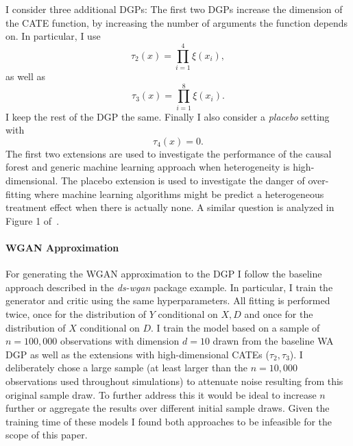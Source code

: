 \documentclass[11pt, a4paper, leqno]{article}
\begin{document}
I consider three additional DGPs: The first two DGPs increase the dimension of the CATE function, by increasing the number of arguments the function depends on.
In particular, I use
\begin{equation*}
    \tau_2(x) = \prod_{i=1}^{4}\xi(x_i),
\end{equation*}
as well as
\begin{equation*}
    \tau_3(x) = \prod_{i=1}^{8}\xi(x_i).
\end{equation*}
I keep the rest of the DGP the same. Finally I also consider a \textit{placebo} setting with
\begin{equation*}
    \tau_4(x) = 0.
\end{equation*}
The first two extensions are used to investigate the performance of the causal forest and generic machine learning approach when heterogeneity is high-dimensional.
The placebo extension is used to investigate the danger of over-fitting where machine learning algorithms might be predict a heterogeneous treatment effect when there is actually none.
A similar question is analyzed in Figure 1 of~\citet{chernozhukov2023genml}.

\paragraph*{WGAN Approximation}
For generating the WGAN approximation to the DGP I follow the baseline approach described in the \textit{ds-wgan} package example.
In particular, I train the generator and critic using the same hyperparameters.
All fitting is performed twice, once for the distribution of $Y$ conditional on $X, D$ and once for the distribution of $X$ conditional on $D$.
I train the model based on a sample of $n=100,000$ observations with dimension $d=10$ drawn from the baseline WA DGP as well as the extensions with high-dimensional CATEs ($\tau_2, \tau_3$).
I deliberately chose a large sample (at least larger than the $n=10,000$ observations used throughout simulations) to attenuate noise resulting from this original sample draw.
To further address this it would be ideal to increase $n$ further or aggregate the results over different initial sample draws.
Given the training time of these models I found both approaches to be infeasible for the scope of this paper.
\end{document}
